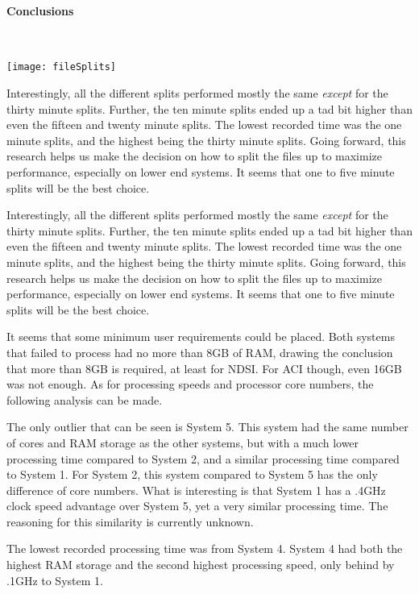 \paragraph{Conclusions} \mbox{}\\[\paragraphheaderspace]
\begin{center}
	\texttt{[image: fileSplits]}
\end{center}
Interestingly, all the different splits performed mostly the same \textit{except} for the thirty minute splits. Further, the ten minute splits ended up a tad bit higher than even the fifteen and twenty minute splits. The lowest recorded time was the one minute splits, and the highest being the thirty minute splits. Going forward, this research helps us make the decision on how to split the files up to maximize performance, especially on lower end systems. It seems that one to five minute splits will be the best choice.\par
Interestingly, all the different splits performed mostly the same \textit{except} for the thirty minute splits. Further, the ten minute splits ended up a tad bit higher than even the fifteen and twenty minute splits. The lowest recorded time was the one minute splits, and the highest being the thirty minute splits. Going forward, this research helps us make the decision on how to split the files up to maximize performance, especially on lower end systems. It seems that one to five minute splits will be the best choice.\par
It seems that some minimum user requirements could be placed. Both systems that failed to process had no more than 8GB of RAM, drawing the conclusion that more than 8GB is required, at least for NDSI. For ACI though, even 16GB was not enough. As for processing speeds and processor core numbers, the following analysis can be made.\par
The only outlier that can be seen is System 5. This system had the same number of cores and RAM storage as the other systems, but with a much lower processing time compared to System 2, and a similar processing time compared to System 1. For System 2, this system compared to System 5 has the only difference of core numbers. What is interesting is that System 1 has a .4GHz clock speed advantage over System 5, yet a very similar processing time. The reasoning for this similarity is currently unknown.\par
The lowest recorded processing time was from System 4. System 4 had both the highest RAM storage and the second highest processing speed, only behind by .1GHz to System 1.\par
